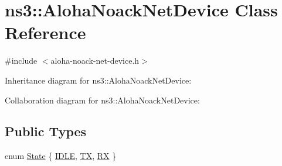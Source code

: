 \hypertarget{classns3_1_1AlohaNoackNetDevice}{}\section{ns3\+:\+:Aloha\+Noack\+Net\+Device Class Reference}
\label{classns3_1_1AlohaNoackNetDevice}


{\ttfamily \#include $<$aloha-\/noack-\/net-\/device.\+h$>$}



Inheritance diagram for ns3\+:\+:Aloha\+Noack\+Net\+Device\+:


Collaboration diagram for ns3\+:\+:Aloha\+Noack\+Net\+Device\+:
\subsection*{Public Types}
\begin{DoxyCompactItemize}
\item 
enum \hyperlink{classns3_1_1AlohaNoackNetDevice_adfe39ae2ca03685fc3dd2a78f9659b60}{State} \{ \hyperlink{classns3_1_1AlohaNoackNetDevice_adfe39ae2ca03685fc3dd2a78f9659b60a551a05fb0276de2fa4e689cecb3849e9}{I\+D\+LE}, 
\hyperlink{classns3_1_1AlohaNoackNetDevice_adfe39ae2ca03685fc3dd2a78f9659b60a7e08d5f8fde8f86791f7fd01a71efb94}{TX}, 
\hyperlink{classns3_1_1AlohaNoackNetDevice_adfe39ae2ca03685fc3dd2a78f9659b60aa076f933ee05e49f5232793867f84b4d}{RX}
 \}
\end{DoxyCompactItemize}
